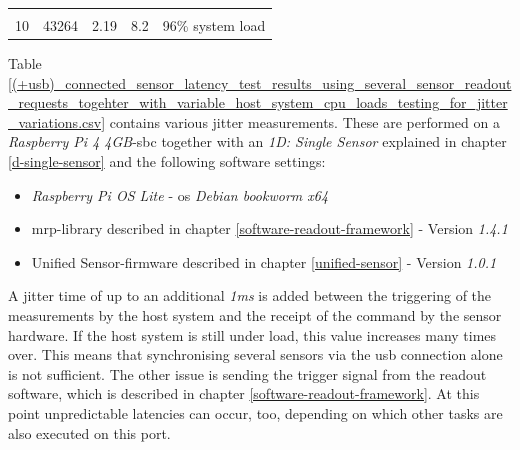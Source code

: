 \begin{longtable}[]{@{}lllll@{}}
\begin{minipage}[t]{0.10\columnwidth}
\strut
\end{minipage}\tabularnewline
\begin{minipage}[t]{0.08\columnwidth}\raggedright
10\strut
\end{minipage} & \begin{minipage}[t]{0.11\columnwidth}\raggedright
43264\strut
\end{minipage} & \begin{minipage}[t]{0.35\columnwidth}\raggedright
2.19\strut
\end{minipage} & \begin{minipage}[t]{0.22\columnwidth}\raggedright
8.2\strut
\end{minipage} & \begin{minipage}[t]{0.10\columnwidth}\raggedright
96\% system load\strut
\end{minipage}\tabularnewline
\bottomrule
\end{longtable}

Table
\ref{(+usb)_connected_sensor_latency_test_results_using_several_sensor_readout_requests_togehter_with_variable_host_system_cpu_loads_testing_for_jitter_variations.csv}
contains various jitter measurements. These are performed on a
\emph{Raspberry Pi 4 4GB}-\gls{sbc} together with an \emph{1D: Single
Sensor} explained in chapter \ref{d-single-sensor} and the following
software settings:

\begin{itemize}
\tightlist
\item
  \emph{Raspberry Pi OS Lite} - \gls{os} \emph{Debian bookworm x64}
\item
  \gls{mrp}-library described in chapter
  \ref{software-readout-framework} - Version \emph{1.4.1}
\item
  Unified Sensor-firmware described in chapter \ref{unified-sensor} -
  Version \emph{1.0.1}
\end{itemize}

A jitter time of up to an additional \emph{1ms} is added between the
triggering of the measurements by the host system and the receipt of the
command by the sensor hardware. If the host system is still under load,
this value increases many times over. This means that synchronising
several sensors via the \gls{usb} connection alone is not sufficient.
The other issue is sending the trigger signal from the readout software,
which is described in chapter \ref{software-readout-framework}. At this
point unpredictable latencies can occur, too, depending on which other
tasks are also executed on this port.

